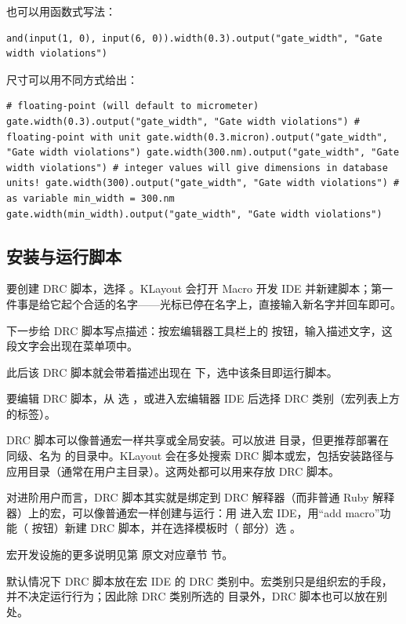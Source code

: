 也可以用函数式写法：

\begin{lstlisting}
and(input(1, 0), input(6, 0)).width(0.3).output("gate_width", "Gate width violations")
\end{lstlisting}

尺寸可以用不同方式给出：

\begin{lstlisting}
# floating-point (will default to micrometer) gate.width(0.3).output("gate_width", "Gate width violations") # floating-point with unit gate.width(0.3.micron).output("gate_width", "Gate width violations") gate.width(300.nm).output("gate_width", "Gate width violations") # integer values will give dimensions in database units! gate.width(300).output("gate_width", "Gate width violations") # as variable min_width = 300.nm gate.width(min_width).output("gate_width", "Gate width violations")
\end{lstlisting}

\subsection{安装与运行脚本}

要创建 DRC 脚本，选择 。KLayout 会打开 Macro 开发 IDE 并新建脚本；第一件事是给它起个合适的名字——光标已停在名字上，直接输入新名字并回车即可。

下一步给 DRC 脚本写点描述：按宏编辑器工具栏上的  按钮，输入描述文字，这段文字会出现在菜单项中。

此后该 DRC 脚本就会带着描述出现在  下，选中该条目即运行脚本。

要编辑 DRC 脚本，从  选 ，或进入宏编辑器 IDE 后选择 DRC 类别（宏列表上方的标签）。

DRC 脚本可以像普通宏一样共享或全局安装。可以放进  目录，但更推荐部署在  同级、名为  的目录中。KLayout 会在多处搜索 DRC 脚本或宏，包括安装路径与应用目录（通常在用户主目录）。这两处都可以用来存放 DRC 脚本。

对进阶用户而言，DRC 脚本其实就是绑定到 DRC 解释器（而非普通 Ruby 解释器）上的宏，可以像普通宏一样创建与运行：用  进入宏 IDE，用“add macro”功能（\ui{+} 按钮）新建 DRC 脚本，并在选择模板时（ 部分）选 。

宏开发设施的更多说明见第 原文对应章节 节。

默认情况下 DRC 脚本放在宏 IDE 的 DRC 类别中。宏类别只是组织宏的手段，并不决定运行行为；因此除 DRC 类别所选的  目录外，DRC 脚本也可以放在别处。

